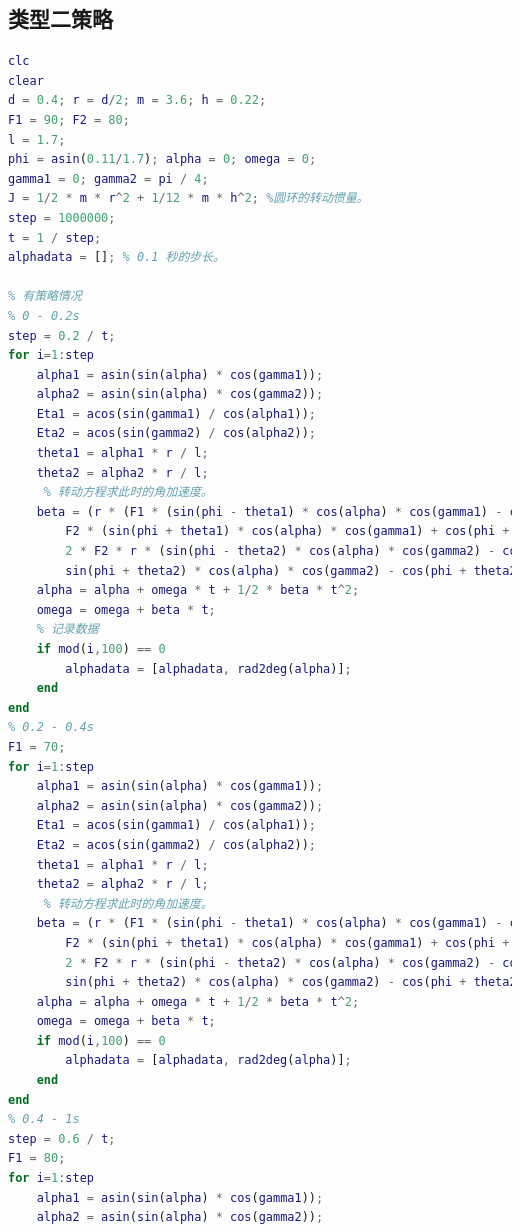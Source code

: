 \documentclass{cumcm}
\begin{document}
\subsection{类型二策略}
\begin{lstlisting}[language=matlab]
% 针对类型二,队员同时发力，但是有队员未掌控力度。
clc
clear
d = 0.4; r = d/2; m = 3.6; h = 0.22;
F1 = 90; F2 = 80;
l = 1.7;
phi = asin(0.11/1.7); alpha = 0; omega = 0;
gamma1 = 0; gamma2 = pi / 4;
J = 1/2 * m * r^2 + 1/12 * m * h^2; %圆环的转动惯量。
step = 1000000;
t = 1 / step;
alphadata = []; % 0.1 秒的步长。

% 有策略情况
% 0 - 0.2s
step = 0.2 / t;
for i=1:step
    alpha1 = asin(sin(alpha) * cos(gamma1));
    alpha2 = asin(sin(alpha) * cos(gamma2));
    Eta1 = acos(sin(gamma1) / cos(alpha1));
    Eta2 = acos(sin(gamma2) / cos(alpha2));
    theta1 = alpha1 * r / l;
    theta2 = alpha2 * r / l;
     % 转动方程求此时的角加速度。
    beta = (r * (F1 * (sin(phi - theta1) * cos(alpha) * cos(gamma1) - cos(phi - theta1) * sin(alpha1) * sin(Eta1)) - ...
        F2 * (sin(phi + theta1) * cos(alpha) * cos(gamma1) + cos(phi + theta1) * sin(alpha1) * sin(Eta1))) + ...
        2 * F2 * r * (sin(phi - theta2) * cos(alpha) * cos(gamma2) - cos(phi - theta2) * sin(alpha2) * sin(Eta2) - ...
        sin(phi + theta2) * cos(alpha) * cos(gamma2) - cos(phi + theta2) * sin(alpha2) * sin(Eta2))) / J;
    alpha = alpha + omega * t + 1/2 * beta * t^2;
    omega = omega + beta * t;
    % 记录数据
    if mod(i,100) == 0
        alphadata = [alphadata, rad2deg(alpha)];
    end
end
% 0.2 - 0.4s
F1 = 70;
for i=1:step
    alpha1 = asin(sin(alpha) * cos(gamma1));
    alpha2 = asin(sin(alpha) * cos(gamma2));
    Eta1 = acos(sin(gamma1) / cos(alpha1));
    Eta2 = acos(sin(gamma2) / cos(alpha2));
    theta1 = alpha1 * r / l;
    theta2 = alpha2 * r / l;
     % 转动方程求此时的角加速度。
    beta = (r * (F1 * (sin(phi - theta1) * cos(alpha) * cos(gamma1) - cos(phi - theta1) * sin(alpha1) * sin(Eta1)) - ...
        F2 * (sin(phi + theta1) * cos(alpha) * cos(gamma1) + cos(phi + theta1) * sin(alpha1) * sin(Eta1))) + ...
        2 * F2 * r * (sin(phi - theta2) * cos(alpha) * cos(gamma2) - cos(phi - theta2) * sin(alpha2) * sin(Eta2) - ...
        sin(phi + theta2) * cos(alpha) * cos(gamma2) - cos(phi + theta2) * sin(alpha2) * sin(Eta2))) / J;
    alpha = alpha + omega * t + 1/2 * beta * t^2;
    omega = omega + beta * t;
    if mod(i,100) == 0
        alphadata = [alphadata, rad2deg(alpha)];
    end
end
% 0.4 - 1s
step = 0.6 / t;
F1 = 80;
for i=1:step
    alpha1 = asin(sin(alpha) * cos(gamma1));
    alpha2 = asin(sin(alpha) * cos(gamma2));

\end{lstlisting}
\end{document}
